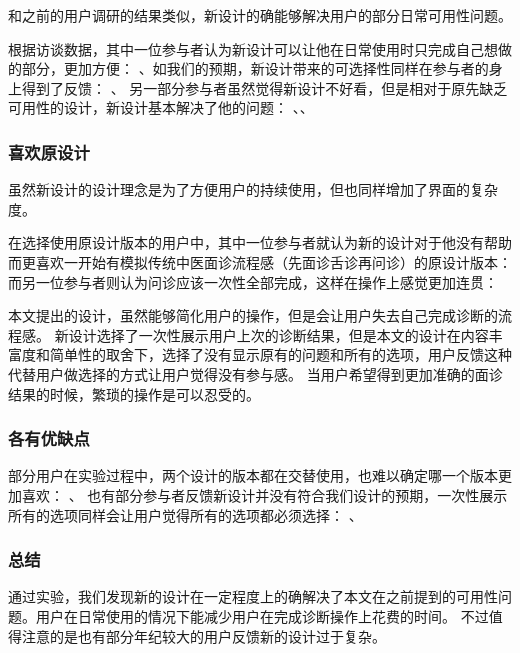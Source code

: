 和之前的用户调研的结果类似，新设计的确能够解决用户的部分日常可用性问题。

根据访谈数据，其中一位参与者认为新设计可以让他在日常使用时只完成自己想做的部分，更加方便：
、如我们的预期，新设计带来的可选择性同样在参与者的身上得到了反馈：
、
另一部分参与者虽然觉得新设计不好看，但是相对于原先缺乏可用性的设计，新设计基本解决了他的问题：
、、


\subsubsection{喜欢原设计}
虽然新设计的设计理念是为了方便用户的持续使用，但也同样增加了界面的复杂度。

在选择使用原设计版本的用户中，其中一位参与者就认为新的设计对于他没有帮助而更喜欢一开始有模拟传统中医面诊流程感（先面诊舌诊再问诊）的原设计版本：
而另一位参与者则认为问诊应该一次性全部完成，这样在操作上感觉更加连贯：

本文提出的设计，虽然能够简化用户的操作，但是会让用户失去自己完成诊断的流程感。
新设计选择了一次性展示用户上次的诊断结果，但是本文的设计在内容丰富度和简单性的取舍下，选择了没有显示原有的问题和所有的选项，用户反馈这种代替用户做选择的方式让用户觉得没有参与感。
当用户希望得到更加准确的面诊结果的时候，繁琐的操作是可以忍受的。

\subsubsection{各有优缺点}
部分用户在实验过程中，两个设计的版本都在交替使用，也难以确定哪一个版本更加喜欢：
、
也有部分参与者反馈新设计并没有符合我们设计的预期，一次性展示所有的选项同样会让用户觉得所有的选项都必须选择：
、

\subsubsection{总结}
通过实验，我们发现新的设计在一定程度上的确解决了本文在之前提到的可用性问题。用户在日常使用的情况下能减少用户在完成诊断操作上花费的时间。
不过值得注意的是也有部分年纪较大的用户反馈新的设计过于复杂。

